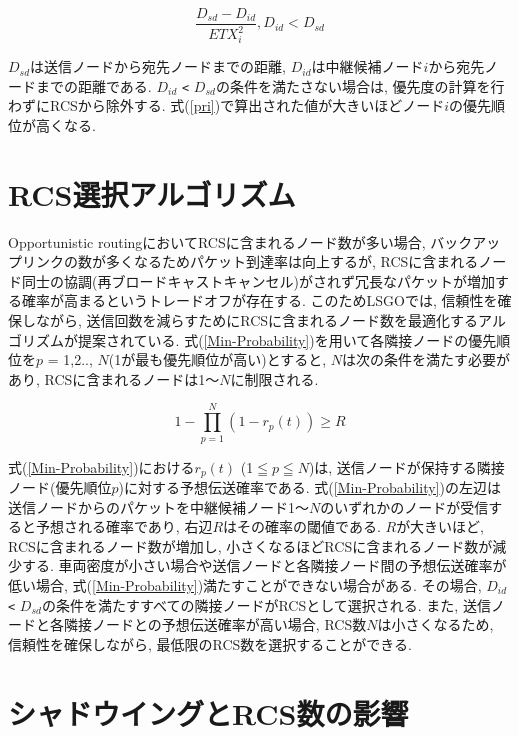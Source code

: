 \documentclass[10pt]{jreport}
\begin{document}
\begin{equation}
	\label{pri-LSGO}
	\frac{D_{sd} - D_{id}}{ETX_{i}^{2}} ,   D_{id} < D_{sd}
\end{equation}

$D_{sd}$は送信ノードから宛先ノードまでの距離, $D_{id}$は中継候補ノード$i$から宛先ノードまでの距離である.  $D_{id}$ \verb|<| $D_{sd}$の条件を満たさない場合は, 優先度の計算を行わずにRCSから除外する.
式(\ref{pri})で算出された値が大きいほどノード$i$の優先順位が高くなる. 

\section{RCS選択アルゴリズム}
Opportunistic routingにおいてRCSに含まれるノード数が多い場合, バックアップリンクの数が多くなるためパケット到達率は向上するが, RCSに含まれるノード同士の協調(再ブロードキャストキャンセル)がされず冗長なパケットが増加する確率が高まるというトレードオフが存在する.  
このためLSGOでは, 信頼性を確保しながら, 送信回数を減らすためにRCSに含まれるノード数を最適化するアルゴリズムが提案されている.  
式(\ref{Min-Probability})を用いて各隣接ノードの優先順位を$p$ = 1,2.., $N$(1が最も優先順位が高い)とすると, $N$は次の条件を満たす必要があり, RCSに含まれるノードは1～$N$に制限される. 

\begin{equation}
	\label{Min-Probability}
	1 - \prod_{p=1}^N (1 - r_{p}(t))\geq R
\end{equation}

式(\ref{Min-Probability})における$r_{p}(t)$ (1$ \leqq $$p$$ \leqq $$N$)は, 送信ノードが保持する隣接ノード(優先順位$p$)に対する予想伝送確率である. 
式(\ref{Min-Probability})の左辺は送信ノードからのパケットを中継候補ノード1～$N$のいずれかのノードが受信すると予想される確率であり, 右辺$R$はその確率の閾値である. $R$が大きいほど, RCSに含まれるノード数が増加し, 小さくなるほどRCSに含まれるノード数が減少する. 車両密度が小さい場合や送信ノードと各隣接ノード間の予想伝送確率が低い場合, 式(\ref{Min-Probability})満たすことができない場合がある. その場合, $D_{id}$ \verb|<| $D_{sd}$の条件を満たすすべての隣接ノードがRCSとして選択される. また, 送信ノードと各隣接ノードとの予想伝送確率が高い場合, RCS数$N$は小さくなるため, 信頼性を確保しながら, 最低限のRCS数を選択することができる. 


\section{シャドウイングとRCS数の影響}
\label{LSGO_evaluation}
\end{document}
